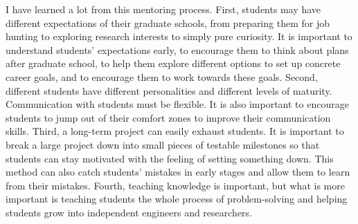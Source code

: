 \documentclass[10pt]{article}
\begin{document}
I have learned a lot from this mentoring process. First, students may have different expectations of their graduate schools, from preparing them for job hunting to exploring research interests to simply pure curiosity. 
It is important to understand students' expectations early, 
to encourage them to think about plans after graduate school, 
to help them explore different options to set up concrete career goals, 
and to encourage them to work towards these goals.
Second, different students have different personalities and different levels of maturity. Communication with students must be flexible. It is also important to encourage students to jump out of their comfort zones to improve their communication skills. 
Third, a long-term project can easily exhaust students. It is important to break a large project
down into small pieces of testable milestones so that students can stay motivated with the feeling of setting something down. 
This method can also catch students' mistakes in early stages and allow them to learn from their mistakes. 
Fourth, teaching knowledge is important, but what is more important is teaching students the whole process of problem-solving and helping students grow into independent engineers and researchers.







%
%
\end{document}
